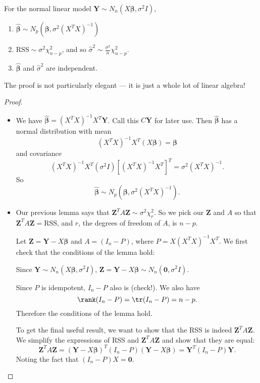 \documentclass[a4paper]{article}
\begin{document}
\begin{thm}
  For the normal linear model $\mathbf{Y}\sim N_n(X\boldsymbol\beta, \sigma^2 I)$,
  \begin{enumerate}
    \item $\hat{\boldsymbol\beta} \sim N_p(\boldsymbol\beta, \sigma^2(X^TX)^{-1})$
    \item $\mathrm{RSS} \sim \sigma^2 \chi_{n - p}^2$, and so $\hat{\sigma}^2 \sim \frac{\sigma^2}{n}\chi_{n -p}^2$.
    \item $\hat{\boldsymbol\beta}$ and $\hat{\sigma}^2$ are independent.
  \end{enumerate}
\end{thm}

The proof is not particularly elegant --- it is just a whole lot of linear algebra!

\begin{proof}\leavevmode
  \begin{itemize}
    \item We have $\hat{\boldsymbol\beta} = (X^TX)^{-1}X^T\mathbf{Y}$. Call this $C\mathbf{Y}$ for later use. Then $\hat {\boldsymbol\beta}$ has a normal distribution with mean
      \[
        (X^TX)^{-1}X^T(X\boldsymbol\beta) = \boldsymbol\beta
      \]
      and covariance
      \[
        (X^TX)^{-1}X^T(\sigma^2 I)[(X^TX)^{-1}X^T]^T = \sigma^2(X^TX)^{-1}.
      \]
      So
      \[
        \hat{\boldsymbol\beta}\sim N_p(\boldsymbol\beta, \sigma^2(X^TX)^{-1}).
      \]
    \item
      Our previous lemma says that $\mathbf{Z}^TA\mathbf{Z}\sim \sigma^2 \chi_r^2$. So we pick our $\mathbf{Z}$ and $A$ so that $\mathbf{Z}^TA\mathbf{Z} = \mathrm{RSS}$, and $r$, the degrees of freedom of $A$, is $n - p$.

      Let $\mathbf{Z} = \mathbf{Y} - X\boldsymbol\beta$ and $A = (I_n - P)$, where $P = X(X^TX)^{-1}X^T$. We first check that the conditions of the lemma hold:

      Since $\mathbf{Y}\sim N_n(X\boldsymbol\beta, \sigma^2 I)$, $\mathbf{Z} = \mathbf{Y} - X\boldsymbol\beta\sim N_n(\mathbf{0}, \sigma^2 I)$.

      Since $P$ is idempotent, $I_n - P$ also is (check!). We also have
      \[
        \rank(I_n - P) = \tr(I_n - P) = n - p.
      \]
      Therefore the conditions of the lemma hold.

      To get the final useful result, we want to show that the RSS is indeed $\mathbf{Z}^TA\mathbf{Z}$. We simplify the expressions of RSS and $\mathbf{Z}^TA\mathbf{Z}$ and show that they are equal:
      \[
        \mathbf{Z}^TA\mathbf{Z} = (\mathbf{Y} - X\boldsymbol\beta)^T(I_n - P)(\mathbf{Y} - X\boldsymbol\beta)=\mathbf{Y}^T(I_n - P)\mathbf{Y}.
      \]
      Noting the fact that $(I_n - P)X = \mathbf{0}$.


\end{itemize}
\end{proof}
\end{document}
